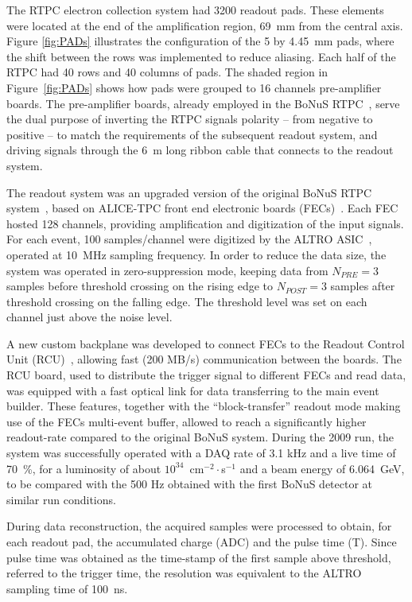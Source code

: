 \documentclass[preprint,5p]{elsarticle}
\begin{document}
The RTPC electron collection system had 3200 readout pads. These elements were
located at the end of the amplification region, 69~mm from the central axis.
Figure \ref{fig:PADs} illustrates the configuration of the 5 by 4.45~mm pads,
where the shift between the rows was implemented to reduce aliasing. Each half 
of the RTPC had 40 rows and 40 columns of pads. The shaded region in 
Figure~\ref{fig:PADs} shows how pads were grouped to 16 channels pre-amplifier 
boards. The pre-amplifier boards, already employed in the BoNuS 
RTPC~\cite{Fenker:2008zz}, serve the dual purpose of inverting the RTPC signals 
polarity -- from negative to positive -- to match the requirements of the 
subsequent readout system, and driving signals through the 6~m long ribbon 
cable that connects to the readout system.

The readout system was an upgraded version of the original BoNuS RTPC 
system~\cite{Fenker:2008zz}, based on ALICE-TPC front end electronic boards 
(FECs)~\cite{ALICE-FEE}.  Each FEC hosted 128 channels, providing amplification 
and digitization of the input signals. For each event, 100 samples/channel were 
digitized by the ALTRO ASIC~\cite{EsteveBosch:2003bj}, operated at 10~MHz 
sampling frequency. In order to reduce the data size, the system was operated 
in zero-suppression mode, keeping data from $N_{PRE}=3$ samples before 
threshold crossing on the rising edge to $N_{POST}=3$ samples after threshold 
crossing on the falling edge.  The threshold level was set on each channel just 
above the noise level.

A new custom backplane was developed to connect FECs to the Readout Control 
Unit (RCU)~\cite{RCU}, allowing fast (200 MB/s) communication between the 
boards. The RCU board, used to distribute the trigger signal to different FECs 
and read data, was equipped with a fast optical link for data transferring to 
the main event builder. These features, together with the ``block-transfer'' 
readout mode making use of the FECs multi-event buffer, allowed to reach a 
significantly higher readout-rate compared to the original BoNuS system. During 
the 2009 run, the system was successfully operated with a DAQ rate of 3.1 kHz 
and a live time of 70~\%, for a luminosity of about 
$10^{34}$~cm$^{-2}\cdot$s$^{-1}$ and a beam energy of 6.064~GeV, to be compared 
with the 500 Hz obtained with the first BoNuS detector at similar run 
conditions.

During data reconstruction, the acquired samples were processed to obtain, 
for each readout pad, the accumulated charge (ADC) and the pulse time (T). Since 
pulse time was obtained as the time-stamp of the first sample above threshold, 
referred to the trigger time, the resolution was equivalent to the ALTRO 
sampling time of 100~ns.
\end{document}
